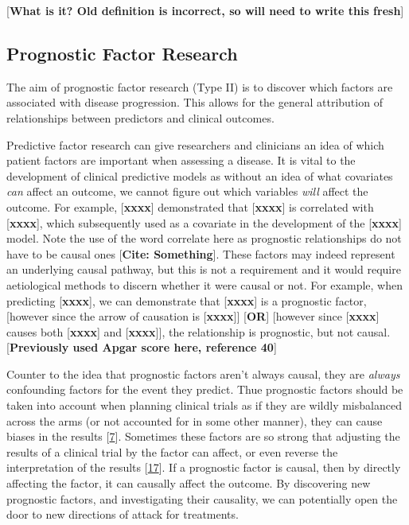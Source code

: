 \documentclass[
]{article}
\begin{document}
{[}\textbf{What is it? Old definition is incorrect, so will need to write this fresh}{]}

\hypertarget{prognostic-factor-research}{%
\subsection{Prognostic Factor Research}\label{prognostic-factor-research}}

The aim of prognostic factor research (Type II) is to discover which factors are associated with disease progression. This allows for the general attribution of relationships between predictors and clinical outcomes.

Predictive factor research can give researchers and clinicians an idea of which patient factors are important when assessing a disease. It is vital to the development of clinical predictive models as without an idea of what covariates \emph{can} affect an outcome, we cannot figure out which variables \emph{will} affect the outcome. For example, {[}\textbf{xxxx}{]} demonstrated that {[}\textbf{xxxx}{]} is correlated with {[}\textbf{xxxx}{]}, which subsequently used as a covariate in the development of the {[}\textbf{xxxx}{]} model. Note the use of the word correlate here as prognostic relationships do not have to be causal ones {[}\textbf{Cite: Something}{]}. These factors may indeed represent an underlying causal pathway, but this is not a requirement and it would require aetiological methods to discern whether it were causal or not. For example, when predicting {[}\textbf{xxxx}{]}, we can demonstrate that {[}\textbf{xxxx}{]} is a prognostic factor, {[}however since the arrow of causation is {[}\textbf{xxxx}{]}{]} {[}\textbf{OR}{]} {[}however since {[}\textbf{xxxx}{]} causes both {[}\textbf{xxxx}{]} and {[}\textbf{xxxx}{]}{]}, the relationship is prognostic, but not causal. {[}\textbf{Previously used Apgar score here, reference 40}{]}

Counter to the idea that prognostic factors aren't always causal, they are \emph{always} confounding factors for the event they predict. Thue prognostic factors should be taken into account when planning clinical trials as if they are wildly misbalanced across the arms (or not accounted for in some other manner), they can cause biases in the results {[}\protect\hyperlink{ref-riley_prognosis_2013}{7}{]}. Sometimes these factors are so strong that adjusting the results of a clinical trial by the factor can affect, or even reverse the interpretation of the results {[}\protect\hyperlink{ref-royston_dichotomizing_2006}{17}{]}. If a prognostic factor is causal, then by directly affecting the factor, it can causally affect the outcome. By discovering new prognostic factors, and investigating their causality, we can potentially open the door to new directions of attack for treatments.
\end{document}
